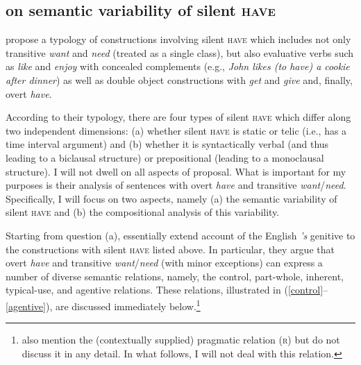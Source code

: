 \documentclass[output=paper]{langscibook}
\begin{document}
\subsection{\citeauthor{Zaroukian.Beller2013} on semantic variability of silent \textsc{have}}\label{section-zaroukian}

\citet{Zaroukian.Beller2013} propose a typology of constructions involving silent \textsc{have} which includes not only transitive \textit{want} and \textit{need} (treated as a single class), but also evaluative verbs such as \textit{like} and \textit{enjoy} with concealed complements (e.g., \textit{John likes (to have) a cookie after dinner}) as well as double object constructions with \textit{get} and \textit{give} and, finally, overt \textit{have}.

According to their typology, there are four types of silent \textsc{have} which differ along two independent dimensions: (a) whether silent \textsc{have} is static or telic (i.e., has a time interval argument) and (b) whether it is syntactically verbal (and thus leading to a biclausal structure) or prepositional (leading to a monoclausal structure). I will not dwell on all aspects of  proposal. What is important for my purposes is their analysis of sentences with overt \textit{have} and transitive \textit{want}/\textit{need}. Specifically, I will focus on two aspects, namely (a) the semantic variability of silent \textsc{have} and (b) the compositional analysis of this variability.

Starting from question (a), \citet{Zaroukian.Beller2013} essentially extend  account of the English \textit{'s} genitive to the constructions with silent \textsc{have} listed above. In particular, they argue that overt \textit{have} and transitive \textit{want}/\textit{need} (with minor exceptions) can express a number of diverse semantic relations, namely, the control, part-whole, inherent, typical-use, and agentive relations. These relations, illustrated in (\ref{control}--\ref{agentive}), are discussed immediately below.\footnote{\citeauthor{Zaroukian.Beller2013} also mention the (contextually supplied) pragmatic relation (\textsc{r}) but do not discuss it in any detail. In what follows, I will not deal with this relation.}
\end{document}
